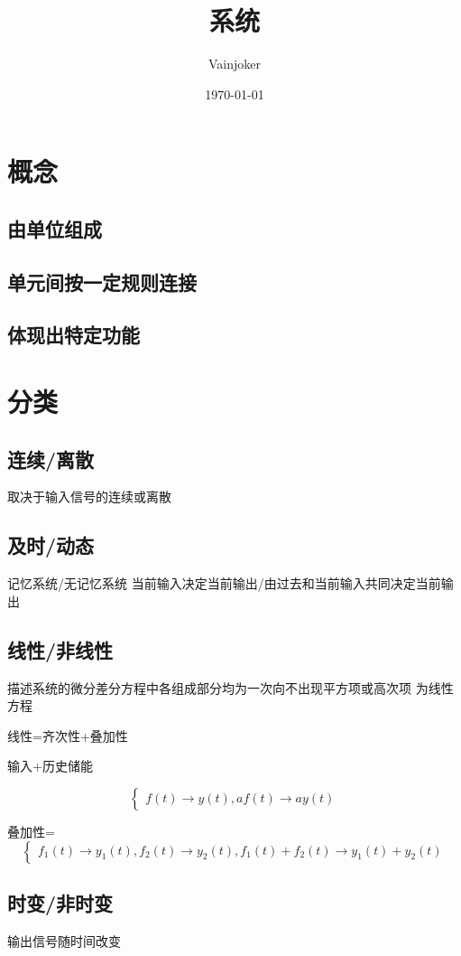 \documentclass{article}
\title{系统}
\author{Vainjoker}
\date{\today}
\begin{document}
    \maketitle
    \newpage
    \section{概念}%
    \subsection{由单位组成}%
    \subsection{单元间按一定规则连接}%
    \subsection{体现出特定功能}%
    \section{分类}%
    \subsection{连续/离散}%
    取决于输入信号的连续或离散
    \subsection{及时/动态}%
    记忆系统/无记忆系统
    当前输入决定当前输出/由过去和当前输入共同决定当前输出
    \subsection{线性/非线性}%
    描述系统的微分差分方程中各组成部分均为一次向不出现平方项或高次项 为线性方程

        线性=齐次性+叠加性

        输入+历史储能

        \[
        \begin{cases}
        f(t)\to y(t),
        af(t)\to ay(t)
        \end{cases}
        \]

        叠加性=
        \[
        \begin{cases}
        f_1(t)\to y_{1}(t),
        f_2(t)\to y_{2}(t),
        f_1(t)+f_2(t)\to y_1(t)+y_{2}(t)
        \end{cases}
        \] 

    \subsection{时变/非时变}%
    输出信号随时间改变
\end{document}
